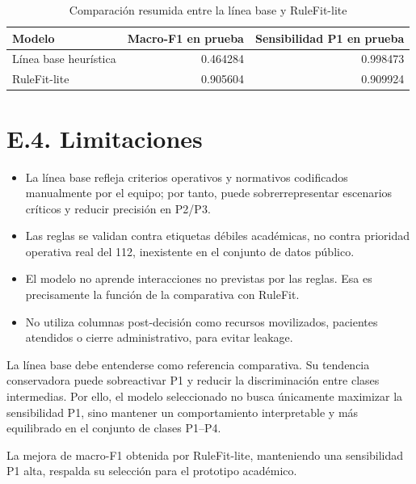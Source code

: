 \begin{table}[ht]
\centering
\caption{Comparación resumida entre la línea base y RuleFit-lite}
\label{tab:baseline-vs-rulefit-lite}
\small
\begin{tabular}{|l|r|r|}
\hline
\textbf{Modelo} & \textbf{Macro-F1 en prueba} & \textbf{Sensibilidad P1 en prueba} \\ \hline
Línea base heurística & 0.464284 & 0.998473 \\ \hline
RuleFit-lite & 0.905604 & 0.909924 \\ \hline
\end{tabular}
\end{table}

\section*{E.4. Limitaciones}

\begin{itemize}
    \item La línea base refleja criterios operativos y normativos codificados manualmente por el equipo; por tanto,
    puede sobrerrepresentar escenarios críticos y reducir precisión en P2/P3.
    \item Las reglas se validan contra etiquetas débiles académicas, no contra prioridad
    operativa real del 112, inexistente en el conjunto de datos público.
    \item El modelo no aprende interacciones no previstas por las reglas. Esa es
    precisamente la función de la comparativa con RuleFit.
    \item No utiliza columnas post-decisión como recursos movilizados, pacientes
    atendidos o cierre administrativo, para evitar leakage.
\end{itemize}

La línea base debe entenderse como referencia comparativa. Su tendencia conservadora puede sobreactivar P1 y
reducir la discriminación entre clases intermedias. Por ello, el modelo seleccionado no
busca únicamente maximizar la sensibilidad P1, sino mantener un comportamiento interpretable y
más equilibrado en el conjunto de clases P1--P4.

La mejora de macro-F1 obtenida por RuleFit-lite, manteniendo una sensibilidad P1 alta,
respalda su selección para el prototipo académico.
